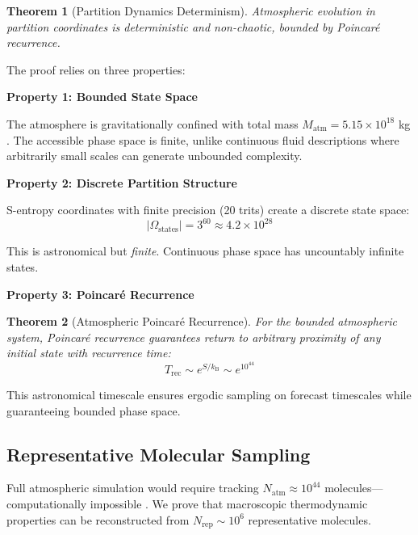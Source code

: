 \documentclass[twocolumn,10pt,a4paper]{article}
\newtheorem{theorem}{Theorem}[section]
\theoremstyle{definition}
\theoremstyle{remark}
\newcommand{\kB}{k_{\mathrm{B}}}
\begin{document}
\begin{theorem}[Partition Dynamics Determinism]
\label{thm:determinism}
Atmospheric evolution in partition coordinates is deterministic and non-chaotic, bounded by Poincaré recurrence.
\end{theorem}

The proof relies on three properties:

\textbf{Property 1: Bounded State Space}

The atmosphere is gravitationally confined with total mass $M_{\text{atm}} = 5.15 \times 10^{18}$ kg \cite{trenberth2005mass}. The accessible phase space is finite, unlike continuous fluid descriptions where arbitrarily small scales can generate unbounded complexity.

\textbf{Property 2: Discrete Partition Structure}

S-entropy coordinates with finite precision (20 trits) create a discrete state space:
\begin{equation}
    |\Omega_{\text{states}}| = 3^{60} \approx 4.2 \times 10^{28}
\end{equation}

This is astronomical but \textit{finite}. Continuous phase space has uncountably infinite states.

\textbf{Property 3: Poincaré Recurrence}

\begin{theorem}[Atmospheric Poincaré Recurrence]
\label{thm:poincare}
For the bounded atmospheric system, Poincaré recurrence guarantees return to arbitrary proximity of any initial state with recurrence time:
\begin{equation}
    T_{\text{rec}} \sim e^{S/\kB} \sim e^{10^{44}}
\end{equation}
\end{theorem}

This astronomical timescale ensures ergodic sampling on forecast timescales while guaranteeing bounded phase space.

\subsection{Representative Molecular Sampling}

Full atmospheric simulation would require tracking $N_{\text{atm}} \approx 10^{44}$ molecules—computationally impossible \cite{batterman2002devil}. We prove that macroscopic thermodynamic properties can be reconstructed from $N_{\text{rep}} \sim 10^6$ representative molecules.
\end{document}
